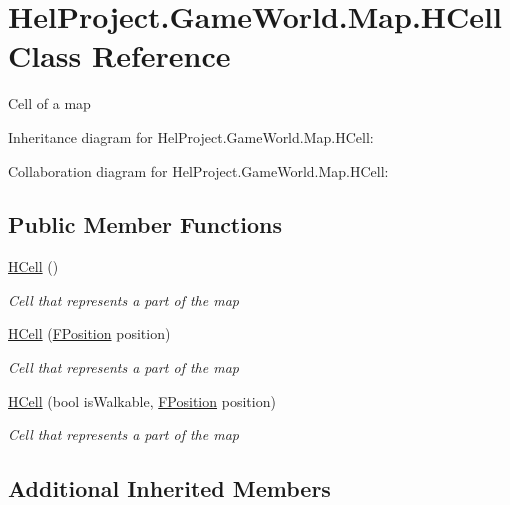 \hypertarget{class_hel_project_1_1_game_world_1_1_map_1_1_h_cell}{}\section{Hel\+Project.\+Game\+World.\+Map.\+H\+Cell Class Reference}
\label{class_hel_project_1_1_game_world_1_1_map_1_1_h_cell}


Cell of a map  




Inheritance diagram for Hel\+Project.\+Game\+World.\+Map.\+H\+Cell\+:


Collaboration diagram for Hel\+Project.\+Game\+World.\+Map.\+H\+Cell\+:
\subsection*{Public Member Functions}
\begin{DoxyCompactItemize}
\item 
\hyperlink{class_hel_project_1_1_game_world_1_1_map_1_1_h_cell_a668a877ddffe6ff8e1dca674214a9c3d}{H\+Cell} ()
\begin{DoxyCompactList}\small\item\em Cell that represents a part of the map \end{DoxyCompactList}\item 
\hyperlink{class_hel_project_1_1_game_world_1_1_map_1_1_h_cell_a9fb3eb7b44be6dd56de9d08e82c5ac37}{H\+Cell} (\hyperlink{class_hel_project_1_1_tools_1_1_f_position}{F\+Position} position)
\begin{DoxyCompactList}\small\item\em Cell that represents a part of the map \end{DoxyCompactList}\item 
\hyperlink{class_hel_project_1_1_game_world_1_1_map_1_1_h_cell_a6c2cce6c12d9efe811297fa9411cc2ac}{H\+Cell} (bool is\+Walkable, \hyperlink{class_hel_project_1_1_tools_1_1_f_position}{F\+Position} position)
\begin{DoxyCompactList}\small\item\em Cell that represents a part of the map \end{DoxyCompactList}\end{DoxyCompactItemize}
\subsection*{Additional Inherited Members}


